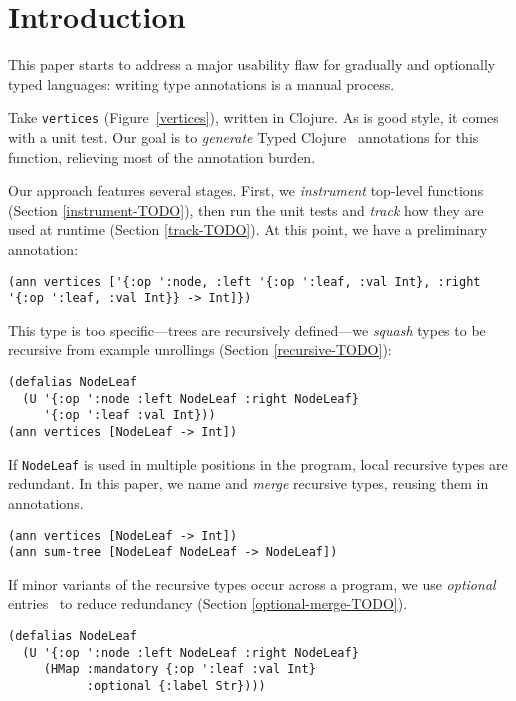 \chapter{Introduction}


This paper starts to address a major usability flaw
for gradually and optionally typed languages:
writing type annotations is a manual process.

Take \texttt{vertices} (Figure~\ref{vertices}),
written in Clojure.
As is good style, it comes with a unit test.
Our goal is to \textit{generate} Typed Clojure~\cite{typed-clojure}
annotations
for this function, relieving most of the annotation
burden.

Our approach features several stages.
First, we \textit{instrument} top-level functions
(Section \ref{instrument-TODO}),
then run the unit tests and \textit{track}
how they are used at runtime
(Section \ref{track-TODO}).
At this point, we have a preliminary
annotation:
%
\begin{Verbatim}
(ann vertices ['{:op ':node, :left '{:op ':leaf, :val Int}, :right '{:op ':leaf, :val Int}} -> Int]})
\end{Verbatim}
%
This type is too specific---trees are recursively
defined---we \textit{squash} types to be
recursive from example unrollings (Section \ref{recursive-TODO}):

\begin{Verbatim}
(defalias NodeLeaf 
  (U '{:op ':node :left NodeLeaf :right NodeLeaf}
     '{:op ':leaf :val Int}))
(ann vertices [NodeLeaf -> Int])
\end{Verbatim}
%
%
If \texttt{NodeLeaf} is used in multiple positions
in the program, local recursive types are redundant.
In this paper, we name and \textit{merge} recursive
types, reusing them in annotations.
%
\begin{Verbatim}
(ann vertices [NodeLeaf -> Int])
(ann sum-tree [NodeLeaf NodeLeaf -> NodeLeaf])
\end{Verbatim}
%
If minor variants of the recursive types occur
across a program,
we use \textit{optional} entries~\cite{typed-clojure}
to reduce redundancy (Section \ref{optional-merge-TODO}).
%
\begin{Verbatim}
(defalias NodeLeaf 
  (U '{:op ':node :left NodeLeaf :right NodeLeaf}
     (HMap :mandatory {:op ':leaf :val Int}
           :optional {:label Str})))
\end{Verbatim}


